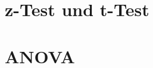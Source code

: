 \documentclass[handout,aspectratio=1610,dvipsnames]{beamer}
\begin{document}
  \section{z-Test und t-Test}
  \let\woopsi\section\let\section\subsection\let\subsection\subsubsection
  
  \let\subsection\section\let\section\woopsi
  
  \section{ANOVA}
  \let\woopsi\section\let\section\subsection\let\subsection\subsubsection
  
  \let\subsection\section\let\section\woopsi
\end{document}
